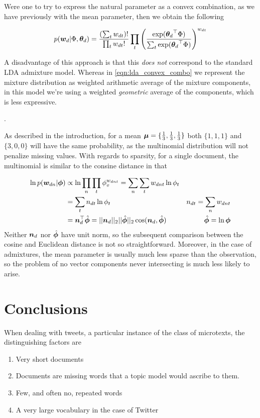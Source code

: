 Were one to try to express the natural parameter as a convex combination, as we have previously with the mean parameter, then we obtain the following

\begin{align}
p({ \bm w_d }|\Phi, { \bm \theta_d }) = \frac{(\sum_t w_{dt})!}{\prod_t w_{dt} !} 
\prod_t \left(   
    \frac{\exp({ \bm \theta_d }^\top\Phi)}{\sum_t \exp({ \bm \theta_d }^\top\Phi)}
\right)^{w_{dt}}
\end{align}

A disadvantage of this approach is that this \emph{does not} correspond to the standard LDA admixture model. Whereas in \eqref{eqn:lda_convex_combo} we represent the mixture distribution as weighted arithmetic average of the mixture components, in this model we're using a weighted \emph{geometric} average of the components, which is less expressive.

.

As described in the introduction, for a mean  $\bm \mu = \{ \frac{1}{3}, \frac{1}{3}, \frac{1}{3} \}$ both $\{1, 1, 1\}$ and $\{3, 0, 0\}$ will have the same probability, as the multinomial distribution will not penalize missing values. With regards to sparsity, for a single document, the multinomial is similar to the consine distance in that

\begin{align*}
\ln p(\bm w_{dn}|\bm \phi) & \propto \ln \prod_n\prod_t \phi_v^{w_{dnt}} = \sum_n\sum_t w_{dnt} \ln \phi_t & \text{ }\\
 & = \sum_t n_{dt} \ln \phi_t & n_{dt} = \sum_n w_{dnt} \\
 & = \bm n_{d}^\top \hat{\bm \phi} =  ||\bm n_{d}||_2 || \hat{\bm \phi}||_2 \cos (\bm n_{d}, \hat{\bm \phi}) & \text{$\hat{\bm \phi} = \ln \bm \phi$}
\end{align*}
Neither $\bm n_d$ nor $\hat{\bm \phi}$ have unit norm, so the subsequent comparison between the cosine and Euclidean distance is not so straightforward. Moreover, in the case of admixtures, the mean parameter is usually much less sparse than the observation, so the problem of no vector components never intersecting is much less likely to arise.



\section{Conclusions}
When dealing with tweets, a particular instance of the class of microtexts, the distinguishing factors are
\begin{enumerate}
    \item Very short documents
    \item Documents are missing words that a topic model would ascribe to them.
    \item Few, and often no, repeated words
    \item A very large vocabulary in the case of Twitter
\end{enumerate}

